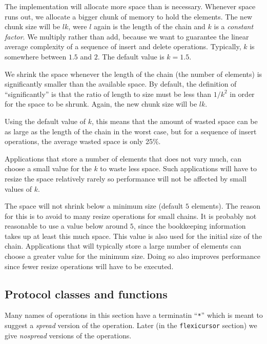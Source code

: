 \documentclass[11pt]{article}
\begin{document}
The implementation will allocate more space than is necessary.
Whenever space runs out, we allocate a bigger chunk of memory to hold
the elements.  The new chunk size will be $lk$, were $l$ again is the
length of the chain and $k$ is a \textit{constant factor}.  We
multiply rather than add, because we want to guarantee the linear
average complexity of a sequence of insert and delete
operations. Typically, $k$ is somewhere between $1.5$ and $2$.  The
default value is $k=1.5$.

We shrink the space whenever the length of the chain (the number of
elements) is significantly smaller than the available space.  By
default, the definition of ``significantly'' is that the ratio of
length to size must be less than $1/k^2$ in order for the space to be
shrunk.  Again, the new chunk size will be $lk$.

Using the default value of $k$, this means that the amount of wasted
space can be as large as the length of the chain in the worst case,
but for a sequence of insert operations, the average wasted space is
only 25\%.

Applications that store a number of elements that does not vary much,
can choose a small value for the $k$ to waste less space.  Such
applications will have to resize the space relatively rarely so
performance will not be affected by small values of $k$.

The space will not shrink below a minimum size (default $5$
elements).  The reason for this is to avoid to many resize operations
for small chains.  It is probably not reasonable to use a value below
around $5$, since the bookkeeping information takes up at least this
much space.  This value is also used for the initial size of the
chain.  Applications that will typically store a large number of
elements can choose a greater value for the minimum size.  Doing so
also improves performance since fewer resize operations will have to
be executed.

\subsection{Protocol classes and functions}

Many names of operations in this section have a terminatin
``\texttt{*}'' which is meant to suggest a \emph{spread} version of
the operation.  Later (in the \texttt{flexicursor} section) we give
\emph{nospread} versions of the operations.


\end{document}
